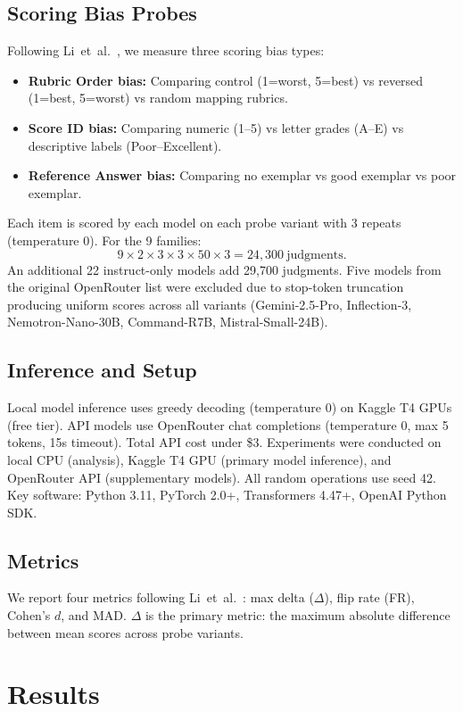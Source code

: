 \documentclass[11pt,twocolumn]{article}
\begin{document}
\subsection{Scoring Bias Probes}
Following Li~et~al.~\cite{li2025scoring}, we measure three scoring bias types:
\begin{itemize}
    \item \textbf{Rubric Order bias:} Comparing control (1=worst, 5=best) vs reversed (1=best, 5=worst) vs random mapping rubrics.
    \item \textbf{Score ID bias:} Comparing numeric (1--5) vs letter grades (A--E) vs descriptive labels (Poor--Excellent).
    \item \textbf{Reference Answer bias:} Comparing no exemplar vs good exemplar vs poor exemplar.
\end{itemize}
Each item is scored by each model on each probe variant with 3 repeats (temperature 0). For the 9 families:
\[
9 \times 2 \times 3 \times 3 \times 50 \times 3 = 24{,}300\ \text{judgments}.
\]
An additional 22 instruct-only models add 29,700 judgments. Five models from the original OpenRouter list were excluded due to stop-token truncation producing uniform scores across all variants (Gemini-2.5-Pro, Inflection-3, Nemotron-Nano-30B, Command-R7B, Mistral-Small-24B).

\subsection{Inference and Setup}
Local model inference uses greedy decoding (temperature 0) on Kaggle T4 GPUs (free tier). API models use OpenRouter chat completions (temperature 0, max 5 tokens, 15s timeout). Total API cost under \$3. Experiments were conducted on local CPU (analysis), Kaggle T4 GPU (primary model inference), and OpenRouter API (supplementary models). All random operations use seed 42. Key software: Python 3.11, PyTorch 2.0+, Transformers 4.47+, OpenAI Python SDK.

\subsection{Metrics}
We report four metrics following Li~et~al.~\cite{li2025scoring}: max delta ($\Delta$), flip rate (FR), Cohen's $d$, and MAD. $\Delta$ is the primary metric: the maximum absolute difference between mean scores across probe variants.

\section{Results}
\end{document}
